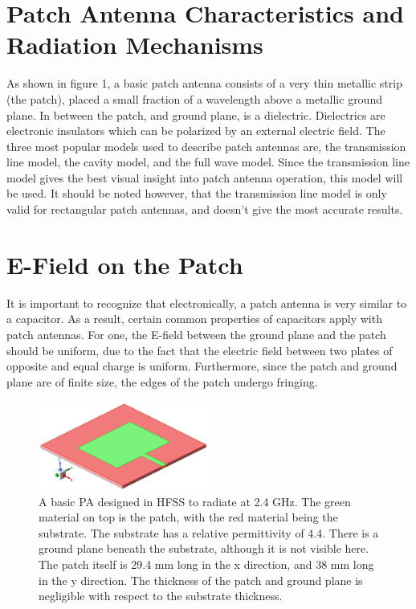 \documentclass[12pt]{article}
\begin{document}
\section{Patch Antenna Characteristics and Radiation Mechanisms}

As shown in figure 1, a basic patch antenna consists of a very thin metallic strip (the patch), placed a small fraction of a wavelength above a metallic ground plane. In between the patch, and ground plane, is a dielectric. Dielectrics are electronic insulators which can be polarized by an external electric field. The three most popular models used to describe patch antennas are, the transmission line model, the cavity model, and the full wave model\cite{balanis2016antenna}. Since the transmission line model gives the best visual insight\cite{balanis2016antenna} into patch antenna operation, this model will be used. It should be noted however, that the transmission line model is only valid for rectangular patch antennas, and doesn't give the most accurate results\cite{balanis2016antenna}.  

\section{E-Field on the Patch}
It is important to recognize that electronically, a patch antenna is very similar to a capacitor. As a result, certain common properties of capacitors apply with patch antennas. For one, the E-field between the ground plane and the patch should be uniform, due to the fact that the electric field between two plates of opposite and equal charge is uniform. Furthermore, since the patch and ground plane are of finite size, the edges of the patch undergo fringing.
\begin{figure}[h]
    \centering
    \includegraphics[width=0.5\textwidth]{2.4GHz-basic-pa.png}
    \caption{A basic PA designed in HFSS to radiate at 2.4 GHz. The green material on top is the patch, with the red material being the substrate. The substrate has a relative permittivity of 4.4. There is a ground plane beneath the substrate, although it is not visible here. The patch itself is 29.4 mm long in the x direction, and 38 mm long in the y direction. The thickness of the patch and ground plane is negligible with respect to the substrate thickness. }
\end{figure}
\end{document}
